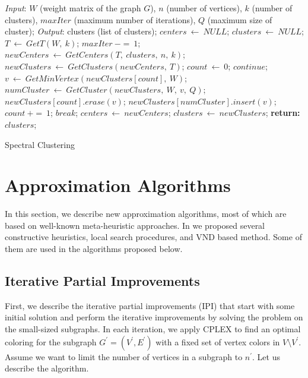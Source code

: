 \documentclass[runningheads]{llncs}
\begin{document}
\begin{algorithm}[!hbtp]
\begin{algorithmic}[1]
\STATE \emph{Input}: $W$ (weight matrix of the graph $G$), $n$ (number of vertices), $k$ (number of clusters), $maxIter$ (maximum number of iterations), $Q$ (maximum size of cluster);
\STATE \emph{Output}: clusters (list of clusters);
\STATE $centers \: \leftarrow \: NULL$;
\STATE $clusters \: \leftarrow \: NULL$;
\STATE $T \: \leftarrow \: GetT(W, \: k)$;
  \STATE $maxIter \: -= \: 1$;
  \STATE $newCenters \: \leftarrow \: GetCenters(T, \: clusters, \: n, \: k)$;
  \STATE $newClusters \: \leftarrow \:  GetClusters(newCenters, \: T)$;
  \STATE $count \: \leftarrow \: 0$;
      \STATE $continue$;
    \ENDIF
      \STATE $v \: \leftarrow \: GetMinVertex(newClusters[count], \: W)$;
      \STATE $numCluster \: \leftarrow \:  GetCluster(newClusters, \: W, \: v, \: Q)$;
      \STATE $newClusters[count].erase(v)$;
      \STATE $newClusters[numCluster].insert(v)$;
    \ENDWHILE
    \STATE $count \: += \: 1$;
  \ENDWHILE
    \STATE $break$;
  \ENDIF
  \STATE $centers \: \leftarrow \: newCenters$;
  \STATE $clusters \: \leftarrow \: newClusters$;
\ENDWHILE
\STATE \textbf{return:} $clusters$;
\end{algorithmic}
\caption{Spectral Clustering} \label{SC}
\end{algorithm}

\section{Approximation Algorithms}

In this section, we describe new approximation algorithms, most of which are based on well-known meta-heuristic approaches. In \cite{Erzin:24} we proposed several constructive heuristics, local search procedures, and VND based method. Some of them are used in the algorithms proposed below.

\subsection{Iterative Partial Improvements}
First, we describe the iterative partial improvements (IPI) that start with some initial solution and perform the iterative improvements by solving the problem on the small-sized subgraphs. In each iteration, we apply CPLEX to find an optimal coloring for the subgraph $G^{\prime} = (V^{\prime}, E^{\prime})$ with a fixed set of vertex colors in $V \setminus V^{\prime}$. Assume we want to limit the number of vertices in a subgraph to $n^{\prime}$. Let us describe the algorithm. \\
\end{document}
